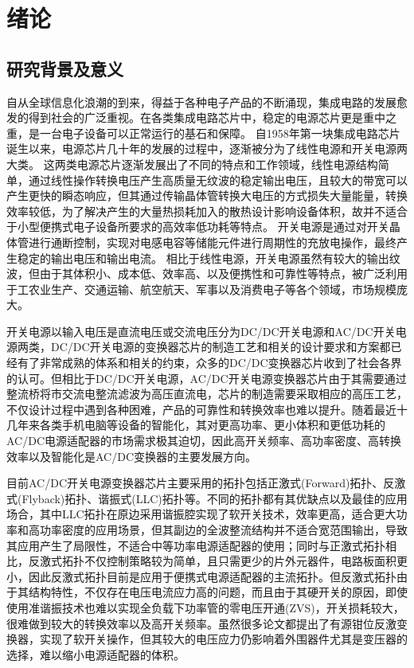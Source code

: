 \chapter{绪论}

\section{研究背景及意义}


自从全球信息化浪潮的到来，得益于各种电子产品的不断涌现，集成电路的发展愈发的得到社会的广泛重视。在各类集成电路芯片中，稳定的电源芯片更是重中之重，是一台电子设备可以正常运行的基石和保障。
自1958年第一块集成电路芯片诞生以来，电源芯片几十年的发展的过程中，逐渐被分为了线性电源和开关电源两大类。
这两类电源芯片逐渐发展出了不同的特点和工作领域，线性电源结构简单，通过线性操作转换电压产生高质量无纹波的稳定输出电压，且较大的带宽可以产生更快的瞬态响应，但其通过传输晶体管转换大电压的方式损失大量能量，转换效率较低，为了解决产生的大量热损耗加入的散热设计影响设备体积，故并不适合于小型便携式电子设备所要求的高效率低功耗等特点。
开关电源是通过对开关晶体管进行通断控制，实现对电感电容等储能元件进行周期性的充放电操作，最终产生稳定的输出电压和输出电流。
相比于线性电源，开关电源虽然有较大的输出纹波，但由于其体积小、成本低、效率高、以及便携性和可靠性等特点，被广泛利用于工农业生产、交通运输、航空航天、军事以及消费电子等各个领域，市场规模庞大\cite{shen2012,ic_power_management_book}。

开关电源以输入电压是直流电压或交流电压分为DC/DC开关电源和AC/DC开关电源两类，DC/DC开关电源的变换器芯片的制造工艺和相关的设计要求和方案都已经有了非常成熟的体系和相关的约束，众多的DC/DC变换器芯片收到了社会各界的认可。但相比于DC/DC开关电源，AC/DC开关电源变换器芯片由于其需要通过整流桥将市交流电整流滤波为高压直流电，芯片的制造需要采取相应的高压工艺，不仅设计过程中遇到各种困难，产品的可靠性和转换效率也难以提升。随着最近十几年来各类手机电脑等设备的智能化，其对更高功率、更小体积和更低功耗的AC/DC电源适配器的市场需求极其迫切，因此高开关频率、高功率密度、高转换效率以及智能化是AC/DC变换器的主要发展方向。

目前AC/DC开关电源变换器芯片主要采用的拓扑包括正激式(Forward)拓扑、反激式(Flyback)拓扑、谐振式(LLC)拓扑等。不同的拓扑都有其优缺点以及最佳的应用场合，其中LLC拓扑在原边采用谐振腔实现了软开关技术，效率更高，适合更大功率和高功率密度的应用场景，但其副边的全波整流结构并不适合宽范围输出，导致其应用产生了局限性，不适合中等功率电源适配器的使用\cite{hu2013,zhang2004}；同时与正激式拓扑相比，反激式拓扑不仅控制策略较为简单，且只需更少的片外元器件，电路板面积更小，因此反激式拓扑目前是应用于便携式电源适配器的主流拓扑。但反激式拓扑由于其结构特性，不仅存在电压电流应力高的问题，而且由于其硬开关的原因，即使使用准谐振技术也难以实现全负载下功率管的零电压开通(ZVS)，开关损耗较大，很难做到较大的转换效率以及高开关频率\cite{li2019analysis}。虽然很多论文\cite{spiazzi2011high,tarzamni2016full,huang2016design}都提出了有源钳位反激变换器，实现了软开关操作，但其较大的电压应力仍影响着外围器件尤其是变压器的选择，难以缩小电源适配器的体积。

